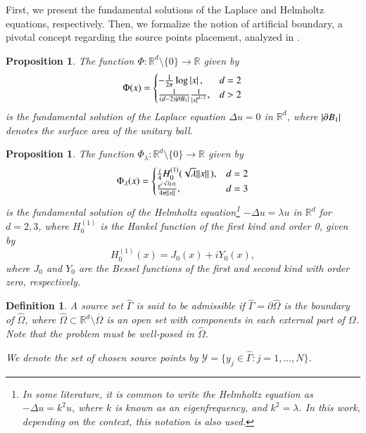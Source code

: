 \documentclass[5p,authoryear]{elsarticle}
\newtheorem{proposition}[theorem]{Proposition}
\newtheorem{definition}[theorem]{Definition}
\begin{document}
First, we present the fundamental solutions of the Laplace and Helmholtz equations, respectively. Then, we formalize the notion of artificial boundary, a pivotal concept regarding the source points placement, analyzed in \cite{alves2009choice}.
\begin{proposition}\label{fundamental_solution_laplace}
    The function \(\Phi: \mathbb{R}^d \setminus \{0\} \rightarrow \mathbb{R}\) given by
    \[
    \Phi(x) = \begin{cases}
        -\frac{1}{2 \pi} \log \abs*{x}, & d=2\\
        \frac{1}{(d-2)\abs{\partial B_1}}\frac{1}{\abs*{x}^{d-2}}, & d > 2
    \end{cases}
    \]
    is the fundamental solution of the Laplace equation \(\Delta u = 0\) in \(\mathbb{R}^d\), where \(\abs{\partial B_1}\) denotes the surface area of the unitary ball.
\end{proposition}
\begin{proposition}\label{helm_fund_sol}
    The function \(\Phi_\lambda: \mathbb{R}^d \setminus \{0\} \rightarrow \mathbb{R}\) given by
    \[
    \Phi_\lambda(x) = \begin{cases}
        \frac{i}{4} H_0^{(1)}(\sqrt{\lambda} \norm*{x}), & d=2\\
        \frac{e^{i \sqrt{\lambda} \norm*{x}}}{4 \pi \norm*{x}}, & d = 3
    \end{cases}
    \]
    is the fundamental solution of the Helmholtz equation\footnote{In some literature, it is common to write the Helmholtz equation as \(-\Delta u = k^2 u\), where \(k\) is known as an eigenfrequency, and \(k^2 = \lambda\). In this work, depending on the context, this notation is also used.} \(-\Delta u =  \lambda u\) in \(\mathbb{R}^d\) for \(d=2,3\), where \(H_0^{(1)}\) is the Hankel function of the first kind and order 0, given by
    \[
        H_0^{(1)}(x) = J_0(x) + i Y_0(x),
    \]
    where \(J_0\) and \(Y_0\) are the Bessel functions of the first and second kind with order zero, respectively.
\end{proposition}
\begin{definition}\label{source_set_definition}
    A source set \(\hat{\Gamma}\) is said to be admissible if \(\hat{\Gamma} = \partial \hat{\Omega}\) is the boundary of \(\hat{\Omega}\), where \(\hat{\Omega} \subset \mathbb{R}^d\setminus\overline{\Omega}\) is an open set with components in each external part of \(\Omega\). Note that the problem must be well-posed in \(\hat{\Omega}\).

    We denote the set of chosen source points by \(\mathcal{Y} = \{y_j \in \hat{\Gamma}: j=1,\dots,N\}\).
\end{definition}
\end{document}

